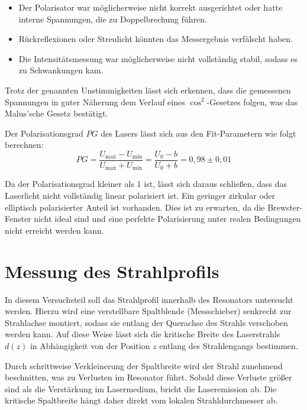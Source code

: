 \begin{itemize}
    \item Der Polarisator war möglicherweise nicht korrekt ausgerichtet oder hatte interne Spannungen, die zu Doppelbrechung führen.
    \item Rückreflexionen oder Streulicht könnten das Messergebnis verfälscht haben.
    \item Die Intensitätsmessung war möglicherweise nicht vollständig stabil, sodass es zu Schwankungen kam.
\end{itemize}

Trotz der genannten Unstimmigkeiten lässt sich erkennen, dass die gemessenen Spannungen in guter Näherung dem Verlauf eines $\cos^2$-Gesetzes folgen, was das Malus’sche Gesetz bestätigt.

Der Polarisationsgrad \( PG \) des Lasers lässt sich aus den Fit-Parametern wie folgt berechnen:
\begin{equation*}
    PG = \frac{U_\text{max} - U_\text{min}}{U_\text{max} + U_\text{min}} = \frac{U_0 - b}{U_0 + b} = 0{,}98 \pm 0{,}01
\end{equation*}

Da der Polarisationsgrad kleiner als 1 ist, lässt sich daraus schließen, dass das Laserlicht nicht vollständig linear polarisiert ist. 
Ein geringer zirkular oder elliptisch polarisierter Anteil ist vorhanden. 
Dies ist zu erwarten, da die Brewster-Fenster nicht ideal sind und eine perfekte Polarisierung unter realen Bedingungen nicht erreicht werden kann.

\section{Messung des Strahlprofils}

In diesem Versuchsteil soll das Strahlprofil innerhalb des Resonators untersucht werden. 
Hierzu wird eine verstellbare Spaltblende (Messschieber) senkrecht zur Strahlachse montiert, sodass sie entlang der Querachse des Strahls verschoben werden kann. 
Auf diese Weise lässt sich die kritische Breite des Laserstrahls \( d(z) \) in Abhängigkeit von der Position \( z \) entlang des Strahlengangs bestimmen.

Durch schrittweise Verkleinerung der Spaltbreite wird der Strahl zunehmend beschnitten, was zu Verlusten im Resonator führt. 
Sobald diese Verluste größer sind als die Verstärkung im Lasermedium, bricht die Laseremission ab. 
Die kritische Spaltbreite hängt daher direkt vom lokalen Strahldurchmesser ab.

